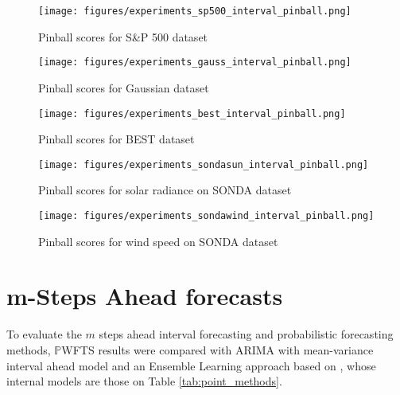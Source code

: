 \begin{figure}
\texttt{[image: figures/experiments\_sp500\_interval\_pinball.png]}
\caption{Pinball scores for S\&P 500 dataset}
\label{fig:experiments_sp500_interval_pinball}
\end{figure}

\begin{figure}
\texttt{[image: figures/experiments\_gauss\_interval\_pinball.png]}
\caption{Pinball scores for Gaussian dataset}
\label{fig:experiments_gauss_interval_pinball}
\end{figure}

\begin{figure}
\texttt{[image: figures/experiments\_best\_interval\_pinball.png]}
\caption{Pinball scores for BEST dataset}
\label{fig:experiments_best_interval_pinball}
\end{figure}

\begin{figure}
\texttt{[image: figures/experiments\_sondasun\_interval\_pinball.png]}
\caption{Pinball scores for solar radiance on SONDA dataset}
\label{fig:experiments_sondasun_interval_pinball}
\end{figure}

\begin{figure}
\texttt{[image: figures/experiments\_sondawind\_interval\_pinball.png]}
\caption{Pinball scores for wind speed on SONDA dataset}
\label{fig:experiments_sondawind_interval_pinball}
\end{figure}


\section{m-Steps Ahead forecasts}


To evaluate the $m$ steps ahead interval forecasting and probabilistic forecasting methods, $\mathbb{P}$WFTS results were compared with ARIMA with mean-variance interval ahead model and an Ensemble Learning approach based on \citep{Mohammed2016}, whose internal models are those on Table \ref{tab:point_methods}.


